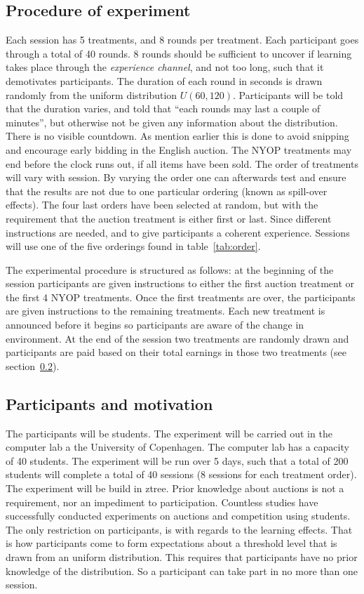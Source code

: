 \documentclass[a4paper,12pt]{article}
\begin{document}
	\subsection{Procedure of experiment}
	
	Each session has 5 treatments, and 8 rounds per treatment. Each participant goes through a total of 40 rounds. 8 rounds should be sufficient to uncover if learning takes place through the \emph{experience channel}, and not too long, such that it demotivates participants. The duration of each round in seconds is drawn randomly from the uniform distribution $U(60, 120)$. Participants will be told that the duration varies, and told that ``each rounds may last a couple of minutes'', but otherwise not be given any information about the distribution. There is no visible countdown. As mention earlier this is done to avoid snipping and encourage early bidding in the English auction. The NYOP treatments may end before the clock runs out, if all items have been sold. The order of treatments will vary with session. By varying the order one can afterwards test and ensure that the results are not due to one particular ordering (known as spill-over effects). The four last orders have been selected at random, but with the requirement that the auction treatment is either first or last. Since different instructions are needed, and to give participants a coherent experience. Sessions will use one of the five orderings found in table~\ref{tab:order}.
	
	The experimental procedure is structured as follows: at the beginning of the session participants are given instructions to either the first auction treatment or the first 4 NYOP treatments. Once the first treatments are over, the participants are given instructions to the remaining treatments. Each new treatment is announced before it begins so participants are aware of the change in environment. At the end of the session two treatments are randomly drawn and participants are paid based on their total earnings in those two treatments (see section~\ref{sec:participants-motivation}).

	\subsection{Participants and motivation}
	\label{sec:participants-motivation}
	The participants will be students. The experiment will be carried out in the computer lab a the University of Copenhagen. The computer lab has a capacity of 40 students. The experiment will be run over 5 days, such that a total of 200 students will complete a total of 40 sessions (8 sessions for each treatment order). The experiment will be build in ztree. Prior knowledge about auctions is not a requirement, nor an impediment to participation. Countless studies have successfully conducted experiments on auctions and competition using students. The only restriction on participants, is with regards to the learning effects. That is how participants come to form expectations about a threshold level that is drawn from an uniform distribution. This requires that participants have no prior knowledge of the distribution. So a participant can take part in no more than one session.
	
\end{document}
